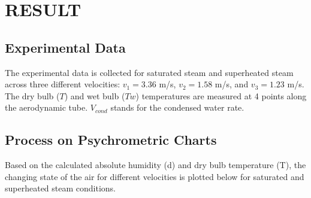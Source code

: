 \section{RESULT}

\subsection{Experimental Data}
The experimental data is collected for saturated steam and superheated steam across three different velocities: $v_1 = 3.36$ m/s, $v_2 = 1.58$ m/s, and $v_3 = 1.23$ m/s. The dry bulb ($T$) and wet bulb ($Tw$) temperatures are measured at 4 points along the aerodynamic tube. $V_{cond}$ stands for the condensed water rate.





\subsection{Process on Psychrometric Charts}
Based on the calculated absolute humidity (d) and dry bulb temperature (T), the changing state of the air for different velocities is plotted below for saturated and superheated steam conditions.

